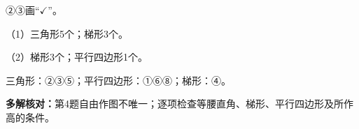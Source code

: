 
\begingroup\color{answerred}②③画“$\checkmark$”。\par\endgroup
{}
\begingroup\color{answerred}\noindent（1）三角形5个；梯形3个。\par
\noindent（2）梯形3个；平行四边形1个。\par\par\endgroup
{}
\begingroup\color{answerred}三角形：②③⑤；平行四边形：①⑥⑧；梯形：④。\par\endgroup
{}
\begingroup\color{answerred}\par\noindent\begin{center}\end{center}\par\endgroup

\begingroup\color{answerred}\textbf{多解核对：}第4题自由作图不唯一；逐项检查等腰直角、梯形、平行四边形及所作高的条件。\par\endgroup
